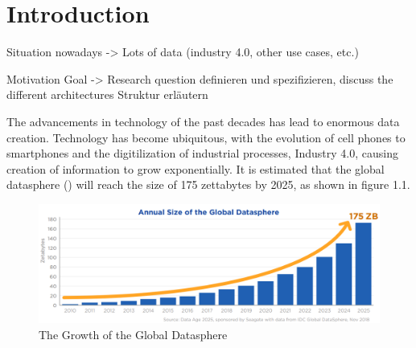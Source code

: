 \chapter{Introduction}
\label{cha:Introduction} %
Situation nowadays -> Lots of data (industry 4.0, other use cases, etc.)

Motivation
Goal -> Research question definieren und spezifizieren, discuss the different architectures
Struktur erläutern

The advancements in technology of the past decades has lead to enormous data creation. Technology has become ubiquitous, 
with the evolution of cell phones to smartphones 
and the digitilization of industrial processes, Industry 4.0, causing creation of information to grow exponentially.
It is estimated that the global datasphere () will reach the size of 175 zettabytes by 2025, as shown in figure 1.1.
\begin{figure}[ht]
\centering
\includegraphics[width=1.0\textwidth]{Bilder/size_global_datasphere.png}
\caption{The Growth of the Global Datasphere \cite[p.6]{idc-seagate-data}}
\label{fig:growth_datasphere}
\end{figure}

